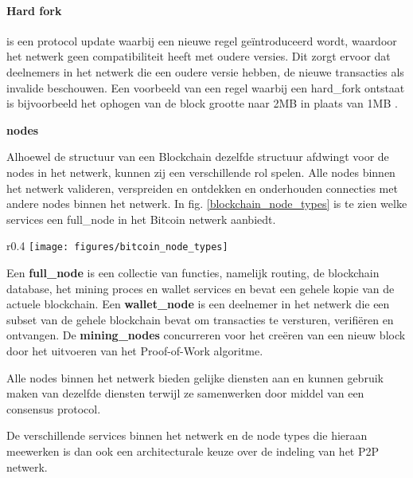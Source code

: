 \paragraph{Hard fork}

is een protocol update waarbij een nieuwe regel geïntroduceerd wordt, waardoor het netwerk geen compatibiliteit heeft met oudere versies. Dit zorgt ervoor dat deelnemers in het netwerk die een oudere versie hebben, de nieuwe transacties als invalide beschouwen. Een voorbeeld van een regel waarbij een \gls{hard_fork} ontstaat is bijvoorbeeld het ophogen van de block grootte naar 2MB in plaats van 1MB \citep[Hard Fork]{coindesk:forks}. 

\newpage
\textbf{\Glspl{node}}

Alhoewel de structuur van een Blockchain dezelfde structuur afdwingt voor de \glspl{node} in het netwerk, kunnen zij een verschillende rol spelen. Alle \glspl{node} binnen het netwerk valideren, verspreiden en ontdekken en onderhouden connecties met andere \glspl{node} binnen het netwerk. In fig. \ref{blockchain_node_types} is te zien welke services een  \gls{full_node} in het Bitcoin netwerk aanbiedt. 

\begin{wrapfigure}{r}{0.4\textwidth}
  \texttt{[image: figures/bitcoin\_node\_types]}
  \caption[Bitcoin Node functionaliteiten] {
    Een bitcoin netwerk node die alle functies bevat: wallet, mining, blockchain database en netwerk routing, \citep[p.~172]{Antonopoulos:2014:MBU:2695500}.
  }
  \label{blockchain_node_types}
\end{wrapfigure}

Een \textbf{\gls{full_node}} is een collectie van functies, namelijk routing, de blockchain database, het mining proces en wallet services en bevat een gehele kopie van de actuele blockchain. Een \textbf{\gls{wallet_node}} is een deelnemer in het netwerk die een subset van de gehele blockchain bevat om transacties te versturen, verifiëren en ontvangen. De \textbf{\glspl{mining_node}} concurreren voor het creëren van een nieuw block door het uitvoeren van het Proof-of-Work algoritme. 

Alle \glspl{node} binnen het netwerk bieden gelijke diensten aan en kunnen gebruik maken van dezelfde diensten terwijl ze samenwerken door middel van een consensus protocol.

De verschillende services binnen het netwerk en de \gls{node} types die hieraan meewerken is dan ook een architecturale keuze over de indeling van het \acrshort{P2P} netwerk.
